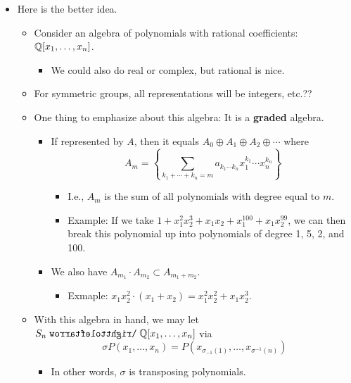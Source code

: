 \documentclass[../notes.tex]{subfiles}
\begin{document}
\begin{itemize}
\begin{itemize}
    \end{itemize}
    \item Here is the better idea.
    \begin{itemize}
        \item Consider an algebra of polynomials with rational coefficients: $\mathbb{Q}[x_1,\dots,x_n]$.
        \begin{itemize}
            \item We could also do real or complex, but rational is nice.
        \end{itemize}
        \item For symmetric groups, all representations will be integers, etc.??
        \item One thing to emphasize about this algebra: It is a \textbf{graded} algebra.
        \begin{itemize}
            \item If represented by $A$, then it equals $A_0\oplus A_1\oplus A_2\oplus\cdots$ where
            \begin{equation*}
                A_m = \left\{ \sum_{k_1+\cdots+k_n=m}a_{k_1\cdots k_n}x_1^{k_1}\cdots x_n^{k_n} \right\}
            \end{equation*}
            \begin{itemize}
                \item I.e., $A_m$ is the sum of all polynomials with degree equal to $m$.
                \item Example: If we take $1+x_1^2x_2^3+x_1x_2+x_1^{100}+x_1x_2^{99}$, we can then break this polynomial up into polynomials of degree 1, 5, 2, and 100.
            \end{itemize}
            \item We also have $A_{m_1}\cdot A_{m_2}\subset A_{m_1+m_2}$.
            \begin{itemize}
                \item Exmaple: $x_1x_2^2\cdot(x_1+x_2)=x_1^2x_2^2+x_1x_2^3$.
            \end{itemize}
        \end{itemize}
        \item With this algebra in hand, we may let $S_n\acts\Q[x_1,\dots,x_n]$ via
        \begin{equation*}
            \sigma P(x_1,\dots,x_n) = P(x_{\sigma_{-1}(1)},\dots,x_{\sigma^{-1}(n)})
        \end{equation*}
        \begin{itemize}
            \item In other words, $\sigma$ is transposing polynomials.

\end{itemize}
\end{itemize}
\end{itemize}
\end{document}
